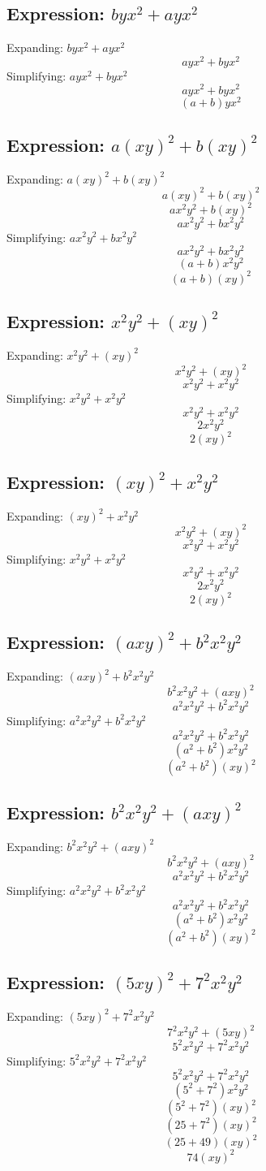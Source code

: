 \documentclass[10pt]{article}
\begin{document}
\subsection*{Expression: $byx^{2} + ayx^{2}$}
Expanding: $byx^{2} + ayx^{2}$
$$ayx^{2} + byx^{2}$$
Simplifying: $ayx^{2} + byx^{2}$
$$ayx^{2} + byx^{2}$$
$$(a + b)yx^{2}$$
\subsection*{Expression: $a(xy)^{2} + b(xy)^{2}$}
Expanding: $a(xy)^{2} + b(xy)^{2}$
$$a(xy)^{2} + b(xy)^{2}$$
$$ax^{2}y^{2} + b(xy)^{2}$$
$$ax^{2}y^{2} + bx^{2}y^{2}$$
Simplifying: $ax^{2}y^{2} + bx^{2}y^{2}$
$$ax^{2}y^{2} + bx^{2}y^{2}$$
$$(a + b)x^{2}y^{2}$$
$$(a + b)(xy)^{2}$$
\subsection*{Expression: $x^{2}y^{2} + (xy)^{2}$}
Expanding: $x^{2}y^{2} + (xy)^{2}$
$$x^{2}y^{2} + (xy)^{2}$$
$$x^{2}y^{2} + x^{2}y^{2}$$
Simplifying: $x^{2}y^{2} + x^{2}y^{2}$
$$x^{2}y^{2} + x^{2}y^{2}$$
$$2x^{2}y^{2}$$
$$2(xy)^{2}$$
\subsection*{Expression: $(xy)^{2} + x^{2}y^{2}$}
Expanding: $(xy)^{2} + x^{2}y^{2}$
$$x^{2}y^{2} + (xy)^{2}$$
$$x^{2}y^{2} + x^{2}y^{2}$$
Simplifying: $x^{2}y^{2} + x^{2}y^{2}$
$$x^{2}y^{2} + x^{2}y^{2}$$
$$2x^{2}y^{2}$$
$$2(xy)^{2}$$
\subsection*{Expression: $(axy)^{2} + b^{2}x^{2}y^{2}$}
Expanding: $(axy)^{2} + b^{2}x^{2}y^{2}$
$$b^{2}x^{2}y^{2} + (axy)^{2}$$
$$a^{2}x^{2}y^{2} + b^{2}x^{2}y^{2}$$
Simplifying: $a^{2}x^{2}y^{2} + b^{2}x^{2}y^{2}$
$$a^{2}x^{2}y^{2} + b^{2}x^{2}y^{2}$$
$$(a^{2} + b^{2})x^{2}y^{2}$$
$$(a^{2} + b^{2})(xy)^{2}$$
\subsection*{Expression: $b^{2}x^{2}y^{2} + (axy)^{2}$}
Expanding: $b^{2}x^{2}y^{2} + (axy)^{2}$
$$b^{2}x^{2}y^{2} + (axy)^{2}$$
$$a^{2}x^{2}y^{2} + b^{2}x^{2}y^{2}$$
Simplifying: $a^{2}x^{2}y^{2} + b^{2}x^{2}y^{2}$
$$a^{2}x^{2}y^{2} + b^{2}x^{2}y^{2}$$
$$(a^{2} + b^{2})x^{2}y^{2}$$
$$(a^{2} + b^{2})(xy)^{2}$$
\subsection*{Expression: $(5xy)^{2} + 7^{2}x^{2}y^{2}$}
Expanding: $(5xy)^{2} + 7^{2}x^{2}y^{2}$
$$7^{2}x^{2}y^{2} + (5xy)^{2}$$
$$5^{2}x^{2}y^{2} + 7^{2}x^{2}y^{2}$$
Simplifying: $5^{2}x^{2}y^{2} + 7^{2}x^{2}y^{2}$
$$5^{2}x^{2}y^{2} + 7^{2}x^{2}y^{2}$$
$$(5^{2} + 7^{2})x^{2}y^{2}$$
$$(5^{2} + 7^{2})(xy)^{2}$$
$$(25 + 7^{2})(xy)^{2}$$
$$(25 + 49)(xy)^{2}$$
$$74(xy)^{2}$$
\end{document}
